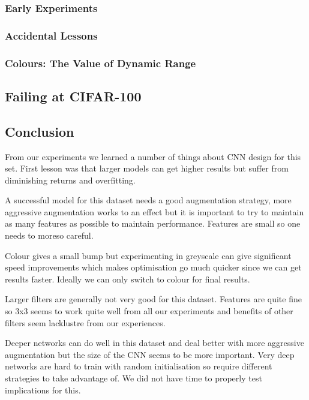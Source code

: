 \subsubsection{Early Experiments}

\subsubsection{Accidental Lessons}

\subsubsection{Colours: The Value of Dynamic Range}

\subsection{Failing at CIFAR-100}

\subsection{Conclusion}
From our experiments we learned a number of things about CNN design for this set. First lesson was that larger models can get higher results but suffer from diminishing returns and overfitting.

A successful model for this dataset needs a good augmentation strategy, more aggressive augmentation works to an effect but it is important to try to maintain as many features as possible to maintain performance. Features are small so one needs to moreso careful.

Colour gives a small bump but experimenting in greyscale can give significant speed improvements which makes optimisation go much quicker since we can get results faster. Ideally we can only switch to colour for final results.

Larger filters are generally not very good for this dataset. Features are quite fine so 3x3 seems to work quite well from all our experiments and benefits of other filters seem lacklustre from our experiences.

Deeper networks can do well in this dataset and deal better with more aggressive augmentation but the size of the CNN seems to be more important. Very deep networks are hard to train with random initialisation so require different strategies to take advantage of. We did not have time to properly test implications for this.